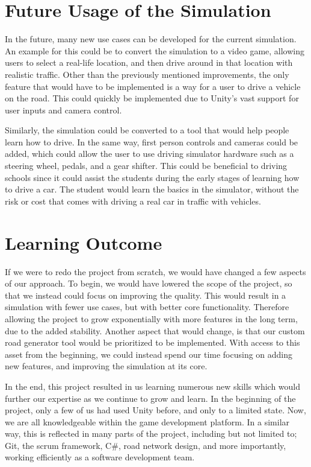     \section{Future Usage of the Simulation}
        In the future, many new use cases can be developed for the current simulation. An example for this could be to convert the simulation to a video game, allowing users to select a real-life location, and then drive around in that location with realistic traffic. Other than the previously mentioned improvements, the only feature that would have to be implemented is a way for a user to drive a vehicle on the road. This could quickly be implemented due to Unity's vast support for user inputs and camera control.

        Similarly, the simulation could be converted to a tool that would help people learn how to drive. In the same way, first person controls and cameras could be added, which could allow the user to use driving simulator hardware such as a steering wheel, pedals, and a gear shifter. This could be beneficial to driving schools since it could assist the students during the early stages of learning how to drive a car. The student would learn the basics in the simulator, without the risk or cost that comes with driving a real car in traffic with vehicles.
    
    \section{Learning Outcome}
        If we were to redo the project from scratch, we would have changed a few aspects of our approach. To begin, we would have lowered the scope of the project, so that we instead could focus on improving the quality. This would result in a simulation with fewer use cases, but with better core functionality. Therefore allowing the project to grow exponentially with more features in the long term, due to the added stability. Another aspect that would change, is that our custom road generator tool would be prioritized to be implemented. With access to this asset from the beginning, we could instead spend our time focusing on adding new features, and improving the simulation at its core.

        In the end, this project resulted in us learning numerous new skills which would further our expertise as we continue to grow and learn. In the beginning of the project, only a few of us had used Unity before, and only to a limited state. Now, we are all knowledgeable within the game development platform. In a similar way, this is reflected in many parts of the project, including but not limited to; Git, the scrum framework, C\#, road network design, and more importantly, working efficiently as a software development team.

